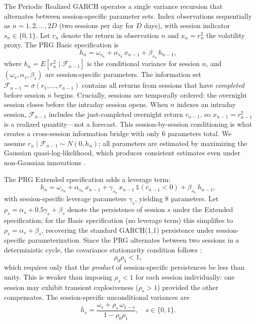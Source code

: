 \documentclass[11pt,a4paper]{article}
\begin{document}
The Periodic Realized GARCH operates a single variance recursion that alternates between session-specific parameter sets. Index observations sequentially as $n = 1, 2, \ldots, 2D$ (two sessions per day for $D$ days), with session indicator $s_n \in \{0, 1\}$. Let $r_n$ denote the return in observation $n$ and $x_n = r^2_n$ the volatility proxy. The PRG Basic specification is
\begin{equation}
    h_n = \omega_{s_n} + \alpha_{s_n} \, x_{n-1} + \beta_{s_n} \, h_{n-1},
    \label{eq:prg_basic}
\end{equation}
where $h_n = E[r^2_n \mid \mathcal{F}_{n-1}]$ is the conditional variance for session $n$, and $(\omega_s, \alpha_s, \beta_s)$ are session-specific parameters. The information set $\mathcal{F}_{n-1} = \sigma(r_1, \ldots, r_{n-1})$ contains all returns from sessions that have \emph{completed} before session $n$ begins. Crucially, sessions are temporally ordered: the overnight session closes before the intraday session opens. When $n$ indexes an intraday session, $\mathcal{F}_{n-1}$ includes the just-completed overnight return $r_{n-1}$, so $x_{n-1} = r^2_{n-1}$ is a realized quantity---not a forecast. This session-by-session conditioning is what creates a cross-session information bridge with only 6 parameters total. We assume $r_n \mid \mathcal{F}_{n-1} \sim N(0, h_n)$; all parameters are estimated by maximizing the Gaussian quasi-log-likelihood, which produces consistent estimates even under non-Gaussian innovations \citep{Bollerslev1996}.

The PRG Extended specification adds a leverage term:
\begin{equation}
    h_n = \omega_{s_n} + \alpha_{s_n} \, x_{n-1} + \gamma_{s_n} \, x_{n-1} \, \mathbb{1}(r_{n-1} < 0) + \beta_{s_n} \, h_{n-1},
    \label{eq:prg_extended}
\end{equation}
with session-specific leverage parameters $\gamma_s$, yielding 8 parameters. Let $\rho_s = \alpha_s + 0.5\gamma_s + \beta_s$ denote the persistence of session $s$ under the Extended specification; for the Basic specification (no leverage term) this simplifies to $\rho_s = \alpha_s + \beta_s$, recovering the standard GARCH(1,1) persistence under session-specific parameterization. Since the PRG alternates between two sessions in a deterministic cycle, the covariance stationarity condition follows \citet{Bollerslev1996}:
\begin{equation}
    \rho_0 \rho_1 < 1,
    \label{eq:stationarity}
\end{equation}
which requires only that the \emph{product} of session-specific persistences be less than unity. This is weaker than imposing $\rho_s < 1$ for each session individually: one session may exhibit transient explosiveness ($\rho_s > 1$) provided the other compensates. The session-specific unconditional variances are
\begin{equation}
    \bar{h}_s = \frac{\omega_s + \rho_s \, \omega_{1-s}}{1 - \rho_0 \rho_1}, \quad s \in \{0, 1\}.
    \label{eq:uncond_var}
\end{equation}
\end{document}
